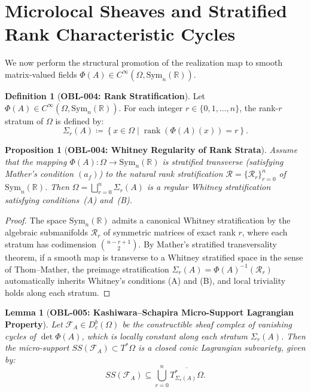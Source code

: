 \documentclass[11pt,a4paper,reqno]{amsart}
\newtheorem{lemma}[theorem]{Lemma}
\newtheorem{proposition}[theorem]{Proposition}
\theoremstyle{definition}
\newtheorem{definition}[theorem]{Definition}
\theoremstyle{remark}
\numberwithin{equation}{section}
\begin{document}
\section{Microlocal Sheaves and Stratified Rank Characteristic Cycles}
\label{sec:microlocal}

We now perform the structural promotion of the realization map to smooth matrix-valued fields $\Phi(A) \in C^\infty(\Omega, \mathrm{Sym}_n(\mathbb{R}))$.

\begin{definition}[\textbf{OBL-004: Rank Stratification}]
\label{def:rank_strat}
Let $\Phi(A) \in C^\infty(\Omega, \mathrm{Sym}_n(\mathbb{R}))$. For each integer $r \in \{0, 1, \dots, n\}$, the rank-$r$ stratum of $\Omega$ is defined by:
\begin{equation}
\Sigma_r(A) \coloneqq \left\{ x \in \Omega \mid \operatorname{rank}(\Phi(A)(x)) = r \right\}.
\end{equation}
\end{definition}

\begin{proposition}[\textbf{OBL-004: Whitney Regularity of Rank Strata}]
\label{prop:whitney_rank_strat}
Assume that the mapping $\Phi(A) \colon \Omega \to \mathrm{Sym}_n(\mathbb{R})$ is stratified transverse (satisfying Mather's condition $(a_f)$) to the natural rank stratification $\mathcal{R} = \{\mathcal{R}_r\}_{r=0}^n$ of $\mathrm{Sym}_n(\mathbb{R})$. Then $\Omega = \bigsqcup_{r=0}^n \Sigma_r(A)$ is a regular Whitney stratification satisfying conditions~(A) and~(B).
\end{proposition}

\begin{proof}
The space $\mathrm{Sym}_n(\mathbb{R})$ admits a canonical Whitney stratification by the algebraic submanifolds $\mathcal{R}_r$ of symmetric matrices of exact rank $r$, where each stratum has codimension $\binom{n-r+1}{2}$. By Mather's stratified transversality theorem, if a smooth map is transverse to a Whitney stratified space in the sense of Thom--Mather, the preimage stratification $\Sigma_r(A) = \Phi(A)^{-1}(\mathcal{R}_r)$ automatically inherits Whitney's conditions (A) and (B), and local triviality holds along each stratum.
\end{proof}

\begin{lemma}[\textbf{OBL-005: Kashiwara--Schapira Micro-Support Lagrangian Property}]
\label{lem:microsupport_lagrangian}
Let $\mathcal{F}_A \in D_c^b(\Omega)$ be the constructible sheaf complex of vanishing cycles of $\det \Phi(A)$, which is locally constant along each stratum $\Sigma_r(A)$. Then the micro-support $SS(\mathcal{F}_A) \subset T^*\Omega$ is a closed conic Lagrangian subvariety, given by:
\begin{equation}
SS(\mathcal{F}_A) \subseteq \bigcup_{r=0}^n \overline{T^*_{\Sigma_r(A)} \Omega}.
\end{equation}
\end{lemma}
\end{document}
